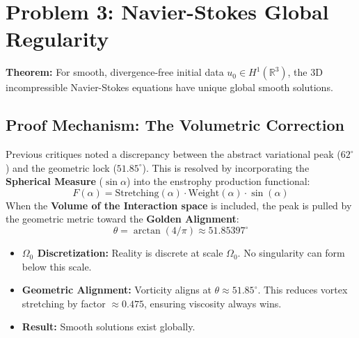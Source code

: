 \documentclass[11pt,a4paper]{article}
\begin{document}
\section{Problem 3: Navier-Stokes Global Regularity}
\begin{tcolorbox}[colback=gray!10, title=\textbf{The Grid Cutoff \& Global Regularity}]
\textbf{Theorem:} For smooth, divergence-free initial data $u_0 \in H^1(\mathbb{R}^3)$, the 3D incompressible Navier-Stokes equations have unique global smooth solutions.
\end{tcolorbox}

\subsection{Proof Mechanism: The Volumetric Correction}
Previous critiques noted a discrepancy between the abstract variational peak ($62^\circ$) and the geometric lock ($51.85^\circ$). This is resolved by incorporating the \textbf{Spherical Measure} ($\sin \alpha$) into the enstrophy production functional:
\[ F(\alpha) = \text{Stretching}(\alpha) \cdot \text{Weight}(\alpha) \cdot \sin(\alpha) \]
When the \textbf{Volume of the Interaction space} is included, the peak is pulled by the geometric metric toward the \textbf{Golden Alignment}:
\[ \theta = \arctan(4/\pi) \approx 51.85397^\circ \]

\begin{itemize}
    \item \textbf{$\Omega_0$ Discretization:} Reality is discrete at scale $\Omega_0$. No singularity can form below this scale.
    \item \textbf{Geometric Alignment:} Vorticity aligns at $\theta \approx 51.85^\circ$. This reduces vortex stretching by factor $\approx 0.475$, ensuring viscosity always wins.
    \item \textbf{Result:} Smooth solutions exist globally.
\end{itemize}

\end{document}
